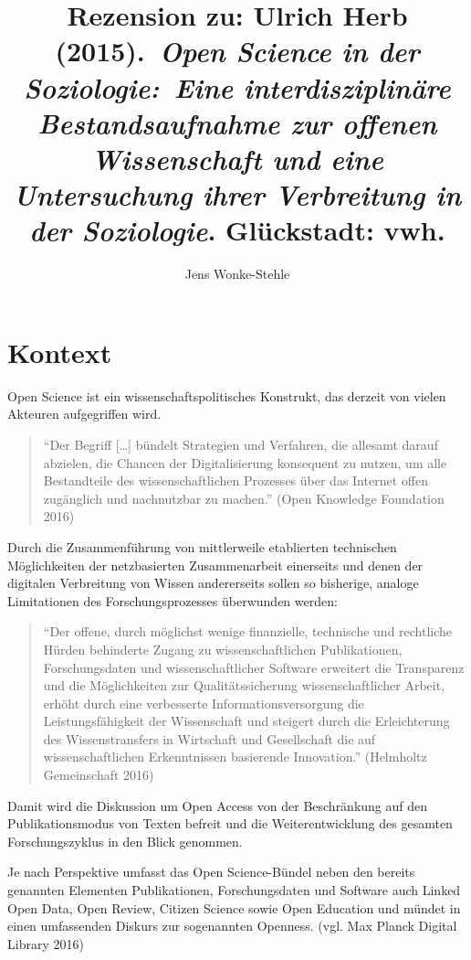 \documentclass[a4paper,
fontsize=11pt,
oneside,
numbers=noperiodatend,
parskip=half-,
bibliography=totoc,
final
]{scrartcl}
\title{\LARGE{Rezension zu: Ulrich Herb (2015). \emph{Open Science in der Soziologie: Eine interdisziplinäre Bestandsaufnahme zur offenen Wissenschaft und eine Untersuchung ihrer Verbreitung in der Soziologie}. Glückstadt: vwh.
}} %
\author{Jens Wonke-Stehle} %
\date{}
\begin{document}
\maketitle
\thispagestyle{fancyplain} 


\section*{Kontext}\label{kontext}

Open Science ist ein wissenschaftspolitisches Konstrukt, das derzeit von
vielen Akteuren aufgegriffen wird.

\begin{quote}
\enquote{Der Begriff {[}\ldots{}{]} bündelt Strategien und Verfahren,
die allesamt darauf abzielen, die Chancen der Digitalisierung konsequent
zu nutzen, um alle Bestandteile des wissenschaftlichen Prozesses über
das Internet offen zugänglich und nachnutzbar zu machen.} (Open
Knowledge Foundation 2016)
\end{quote}

Durch die Zusammenführung von mittlerweile etablierten technischen
Möglichkeiten der netzbasierten Zusammenarbeit einerseits und denen der
digitalen Verbreitung von Wissen andererseits sollen so bisherige,
analoge Limitationen des Forschungsprozesses überwunden werden:

\begin{quote}
\enquote{Der offene, durch möglichst wenige finanzielle, technische und
rechtliche Hürden behinderte Zugang zu wissenschaftlichen Publikationen,
Forschungsdaten und wissenschaftlicher Software erweitert die
Transparenz und die Möglichkeiten zur Qualitätssicherung
wissenschaftlicher Arbeit, erhöht durch eine verbesserte
Informationsversorgung die Leistungsfähigkeit der Wissenschaft und
steigert durch die Erleichterung des Wissenstransfers in Wirtschaft und
Gesellschaft die auf wissenschaftlichen Erkenntnissen basierende
Innovation.} (Helmholtz Gemeinschaft 2016)
\end{quote}

Damit wird die Diskussion um Open Access von der Beschränkung auf den
Publikationsmodus von Texten befreit und die Weiterentwicklung des
gesamten Forschungszyklus in den Blick genommen.

Je nach Perspektive umfasst das Open Science-Bündel neben den bereits
genannten Elementen Publikationen, Forschungsdaten und Software auch
Linked Open Data, Open Review, Citizen Science sowie Open Education und
mündet in einen umfassenden Diskurs zur sogenannten Openness. (vgl. Max
Planck Digital Library 2016)
\end{document}
